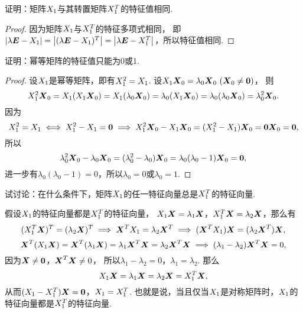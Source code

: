 \begin{example}
证明：矩阵\(\A\)与其转置矩阵\(\A^T\)的特征值相同.
\begin{proof}
因为矩阵\(\A\)与\(\A^T\)的特征多项式相同，
即\(\abs{\lambda\E-\A} = \abs{(\lambda\E-\A)^T} = \abs{\lambda\E-\A^T}\)，所以特征值相同.
\end{proof}
\end{example}

\begin{example}
证明：幂等矩阵的特征值只能为0或1.
\begin{proof}
设\(\A\)是幂等矩阵，即有\(\A^2=\A\).
设\(\A\x_0=\lambda_0\x_0\ (\x_0\neq\z)\)，
则\[
	\A^2\x_0=\A(\A\x_0)=\A(\lambda_0\x_0)=\lambda_0(\A\x_0)=\lambda_0(\lambda_0\x_0)=\lambda_0^2\x_0.
\]
因为\[
	\A^2=\A
	\iff
	\A^2-\A=\z
	\implies
	\A^2\x_0-\A\x_0=(\A^2-\A)\x_0=\z\x_0=\z,
\]
所以\[
	\lambda_0^2\x_0-\lambda_0\x_0=(\lambda_0^2-\lambda_0)\x_0=\lambda_0(\lambda_0-1)\x_0=\z,
\]
进一步有\(\lambda_0(\lambda_0-1)=0\)，所以\(\lambda_0=0\)或\(\lambda_0=1\).
\end{proof}
\end{example}

\begin{example}
试讨论：在什么条件下，矩阵\(\A\)的任一特征向量总是\(\A^T\)的特征向量.
\begin{solution}
假设\(\A\)的特征向量都是\(\A^T\)的特征向量，
\(\A\x=\lambda_1\x\)，\(\A^T\x=\lambda_2\x\)，那么有\[
	(\A^T\x)^T=(\lambda_2\x)^T
	\implies
	\x^T\A=\lambda_2\x^T
	\implies
	(\x^T\A)\x=(\lambda_2\x^T)\x,
\]\[
	\x^T(\A\x)=\x^T(\lambda_1\x)=\lambda_1\x^T\x=\lambda_2\x^T\x
	\implies
	(\lambda_1-\lambda_2)\x^T\x=0,
\]
因为\(\x\neq\z\)，\(\x^T\x\neq0\)，
所以\(\lambda_1-\lambda_2=0\)，\(\lambda_1=\lambda_2\).
那么\[
	\A\x=\lambda_1\x=\lambda_2\x=\A^T\x,
\]
从而\((\A-\A^T)\x=\z\)，\(\A=\A^T\).
也就是说，当且仅当\(\A\)是对称矩阵时，\(\A\)的特征向量都是\(\A^T\)的特征向量.
\end{solution}
\end{example}

